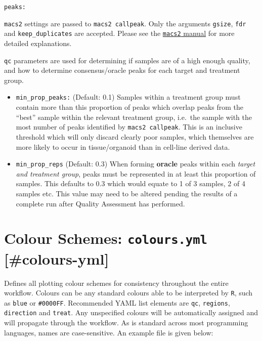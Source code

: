 \documentclass[
]{book}
\providecommand{\tightlist}{%
  \setlength{\itemsep}{0pt}\setlength{\parskip}{0pt}}
\begin{document}
\texttt{peaks:}

\texttt{macs2} settings are passed to \texttt{macs2\ callpeak}. Only the arguments \texttt{gsize}, \texttt{fdr} and \texttt{keep\_duplicates} are accepted.
Please see the \href{https://macs3-project.github.io/MACS/}{\texttt{macs2} manual} for more detailed explanations.

\texttt{qc} parameters are used for determining if samples are of a high enough quality, and how to determine consensus/oracle peaks for each target and treatment group.

\begin{itemize}
\tightlist
\item
  \texttt{min\_prop\_peaks:} (Default: 0.1) Samples within a treatment group must contain more than this proportion of peaks which overlap peaks from the ``best'' sample within the relevant treatment group, i.e.~the sample with the most number of peaks identified by \texttt{macs2\ callpeak}. This is an inclusive threshold which will only discard clearly poor samples, which themselves are more likely to occur in tissue/organoid than in cell-line derived data.
\item
  \texttt{min\_prop\_reps} (Default: 0.3) When forming \textbf{oracle} peaks within each \emph{target and treatment group}, peaks must be represented in at least this proportion of samples. This defaults to 0.3 which would equate to 1 of 3 samples, 2 of 4 samples etc. This value may need to be altered pending the results of a complete run after Quality Assessment has performed.
\end{itemize}

\hypertarget{colour-schemes-colours.yml-colours-yml}{%
\section{\texorpdfstring{Colour Schemes: \texttt{colours.yml} {[}\#colours-yml{]}}{Colour Schemes: colours.yml {[}\#colours-yml{]}}}\label{colour-schemes-colours.yml-colours-yml}}

Defines all plotting colour schemes for consistency throughout the entire workflow.
Colours can be any standard colours able to be interpreted by \texttt{R}, such as \texttt{\textquotesingle{}blue\textquotesingle{}} or \texttt{\textquotesingle{}\#0000FF\textquotesingle{}}.
Recommended YAML list elements are \texttt{qc}, \texttt{regions}, \texttt{direction} and \texttt{treat}.
Any unspecified colours will be automatically assigned and will propagate through the workflow.
As is standard across most programming languages, names are case-sensitive.
An example file is given below:
\end{document}
